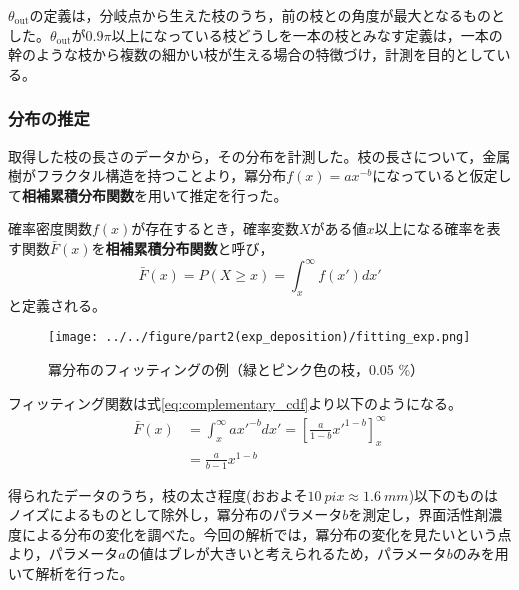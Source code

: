 \documentclass[autodetect-engine,dvi=dvipdfmx,a4paper,ja=standard,oneside,openany,11pt,draft]{bxjsbook}
\begin{document}
$\theta_{\mathrm{out}}$の定義は，分岐点から生えた枝のうち，前の枝との角度が最大となるものとした。$\theta_{\mathrm{out}}$が$0.9\pi$以上になっている枝どうしを一本の枝とみなす定義は，一本の幹のような枝から複数の細かい枝が生える場合の特徴づけ，計測を目的としている。
\subsubsection{分布の推定}
取得した枝の長さのデータから，その分布を計測した。枝の長さについて，金属樹がフラクタル構造を持つことより，冪分布$f(x)=ax^{-b}$になっていると仮定して\textbf{相補累積分布関数}を用いて推定を行った。

確率密度関数$f(x)$が存在するとき，確率変数$X$がある値$x$以上になる確率を表す関数$\bar{F}(x)$を\textbf{相補累積分布関数}と呼び，
\begin{equation}
  \bar{F}(x) = P(X \geq x) = \int_{x}^{\infty} f(x')dx'
  \label{eq:complementary_cdf}
\end{equation}
と定義される。

\begin{wrapfigure}{r}[0pt]{0.33\textwidth}
  \begin{center}
    \texttt{[image: ../../figure/part2(exp\_deposition)/fitting\_exp.png]}
  \end{center}
  \caption{冪分布のフィッティングの例（緑とピンク色の枝，0.05 \%）}
  \label{fig:fitting_exp}
\end{wrapfigure}

フィッティング関数は式\eqref{eq:complementary_cdf}より以下のようになる。
\begin{equation}
  \begin{split}
    \bar{F}(x) & = \int_{x}^{\infty} ax'^{-b}dx' = \left[ \frac{a}{1-b}x'^{1-b} \right]_{x}^{\infty} \\
               & = \frac{a}{b-1}x^{1-b}
  \end{split}
\end{equation}

得られたデータのうち，枝の太さ程度(おおよそ$\SI{10}{pix}\approx\SI{1.6}{mm}$)以下のものはノイズによるものとして除外し，冪分布のパラメータ$b$を測定し，界面活性剤濃度による分布の変化を調べた。今回の解析では，冪分布の変化を見たいという点より，パラメータ$a$の値はブレが大きいと考えられるため，パラメータ$b$のみを用いて解析を行った。

\ifdraft{
  
  
}{}
\end{document}
